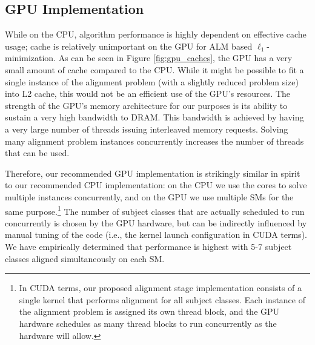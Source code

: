 \subsection{GPU Implementation} 
\label{sec:alignment_implementation_gpu}
While on the CPU, algorithm performance is highly dependent on effective
cache usage; cache is relatively unimportant on the GPU for ALM based
$\ell_1$-minimization.  As can be seen in Figure \ref{fig:gpu_caches}, the GPU has 
a very small amount of cache compared to the CPU.  While it might be possible
to fit a single instance of the alignment problem (with a slightly reduced problem size)
into L2 cache, this would not be an efficient use of the GPU's resources.
The strength of the GPU's memory architecture for our purposes is its ability to sustain a very
high bandwidth to DRAM.  This bandwidth is achieved by having a very large number of
threads issuing interleaved memory requests.  Solving many alignment problem instances
concurrently increases the number of threads that can be used.

Therefore, our recommended GPU implementation is strikingly similar in spirit
to our recommended CPU implementation: on the CPU we use the cores to solve
multiple instances concurrently, and on the GPU we use multiple SMs for the 
same purpose.\footnote{In CUDA terms, our proposed alignment stage
implementation consists of a single kernel that performs alignment for all
subject classes.  Each instance of the alignment problem is assigned its own
thread block, and the GPU hardware schedules as many thread blocks to run
concurrently as the hardware will allow.} The number of subject classes that
are actually scheduled to run concurrently is chosen by the GPU hardware, 
but can be indirectly influenced by manual tuning of the code (i.e., the kernel launch
configuration in CUDA terms). We have empirically determined
that performance is highest with 5-7 subject classes aligned simultaneously on each SM.

